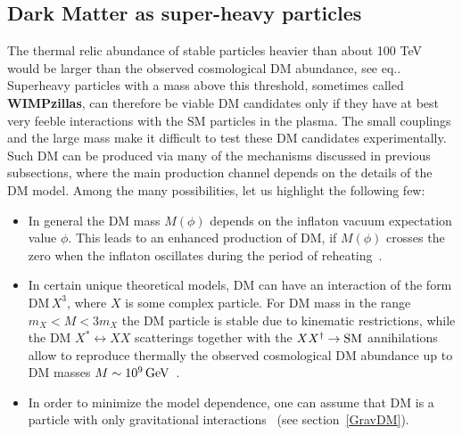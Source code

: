 \subsection{Dark Matter as super-heavy particles}
\label{ultraheavy}
The thermal relic abundance of stable particles heavier than about 100 TeV
would be larger than the observed cosmological DM  abundance, see eq..
Superheavy particles with a mass above this threshold, sometimes called {\bf  WIMPzillas}, can therefore be viable DM candidates only if they have at best very feeble interactions with the SM particles in the plasma.
The small couplings and the large mass make it difficult to test these DM candidates experimentally.
Such DM can be produced via many of the  mechanisms discussed in previous subsections, where the main production channel depends on the details of the DM model.
Among the many possibilities, let us highlight the following few:
\begin{itemize}
\item[$\circ$] In general the DM mass $M(\phi)$ depends on the inflaton vacuum expectation value $\phi$.
This leads to an enhanced production of DM, if $M(\phi)$ crosses the zero when the inflaton oscillates during the period of reheating~\cite{DMprodInflation}.

\item[$\circ$] 
In certain unique theoretical models, DM can have an interaction of the form DM\,$X^3$,  where $X$ is some complex
particle.
For DM mass in the range $m_X < M < 3 m_X$ the DM particle is stable due to kinematic restrictions, while the DM $X^*\leftrightarrow XX$ scatterings 
together with the $X X^\dagger \to{\rm SM}$ annihilations
allow to reproduce thermally  the observed cosmological DM abundance up to DM masses $M \sim 10^9\,{\rm GeV}$~\cite{2003.04900}.

\item[$\circ$]
In order to minimize the model dependence, one can assume that DM is a particle with only  gravitational  interactions~\cite{GravDM} (see section~\ref{GravDM}).

\end{itemize}





